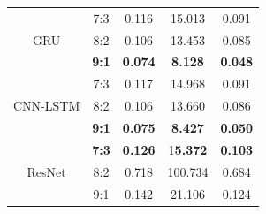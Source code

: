 \documentclass[conference]{IEEEtran}
\begin{document}
\begin{table}[H]
\begin{tabular}{|c|c|c|c|c|}
         \hline
         \multirow{3}{*}{GRU} & 7:3 & 0.116 & 15.013 & 0.091 \\ 
         & 8:2 & 0.106 & 13.453 & 0.085 \\ 
         & \textbf{9:1} & \textbf{0.074} & \textbf{8.128} & \textbf{0.048} \\
         \hline
         \multirow{3}{*}{CNN-LSTM} & 7:3 & 0.117 & 14.968 & 0.091 \\ 
         & 8:2 & 0.106 & 13.660 & 0.086 \\ 
         & \textbf{9:1} & \textbf{0.075} & \textbf{8.427} & \textbf{0.050} \\
         \hline
         \multirow{3}{*}{ResNet} & \textbf{7:3} & \textbf{0.126} & 1\textbf{5.372} & \textbf{0.103} \\ 
         & 8:2 & 0.718 & 100.734 & 0.684 \\ 
         & {9:1} & {0.142} & {21.106} & {0.124} \\
         \hline

    \end{tabular}
    \label{CMGresult}
\end{table}
\end{document}
